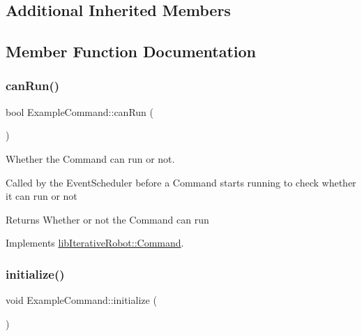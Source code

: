\subsection*{Additional Inherited Members}


\subsection{Member Function Documentation}
\mbox{\label{class_example_command_ad1df0170d99bcef6c6bc1676551f9539}} 
\subsubsection{\texorpdfstring{canRun()}{canRun()}}
{\footnotesize\ttfamily bool Example\+Command\+::can\+Run (\begin{DoxyParamCaption}{ }\end{DoxyParamCaption})\hspace{0.3cm}{\ttfamily [virtual]}}



Whether the Command can run or not. 

Called by the Event\+Scheduler before a Command starts running to check whether it can run or not

\begin{DoxyReturn}{Returns}
Whether or not the Command can run 
\end{DoxyReturn}


Implements \mbox{\hyperlink{classlib_iterative_robot_1_1_command_aebef0fdf029a15ee48fbb778c4265609}{lib\+Iterative\+Robot\+::\+Command}}.

\mbox{\label{class_example_command_ae7bea17127c1697acbf90d6022eb5b5d}} 
\subsubsection{\texorpdfstring{initialize()}{initialize()}}
{\footnotesize\ttfamily void Example\+Command\+::initialize (\begin{DoxyParamCaption}{ }\end{DoxyParamCaption})\hspace{0.3cm}{\ttfamily [virtual]}}



